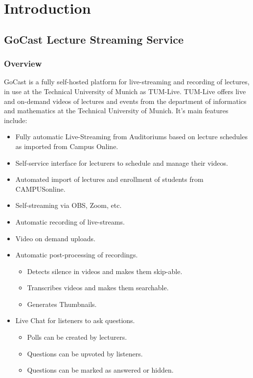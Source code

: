 
\chapter{Introduction}\label{chapter:introduction}

\section{GoCast Lecture Streaming Service}

\subsection{Overview}

GoCast is a fully self-hosted platform for live-streaming and recording of lectures, in use at the Technical University of Munich as TUM-Live.
TUM-Live offers live and on-demand videos of lectures and events from the department of informatics and mathematics at the Technical University of Munich. 
It's main features include:

\begin{itemize}
    \item Fully automatic Live-Streaming from Auditoriums based on lecture schedules as imported from Campus Online.
    \item Self-service interface for lecturers to schedule and manage their videos.
    \item Automated import of lectures and enrollment of students from CAMPUSonline.
    \item Self-streaming via OBS, Zoom, etc.
    \item Automatic recording of live-streams.
    \item Video on demand uploads.
    \item Automatic post-processing of recordings.
    \begin{itemize}
        \item Detects silence in videos and makes them skip-able.
        \item Transcribes videos and makes them searchable.
        \item Generates Thumbnails.
    \end{itemize}
    \item Live Chat for listeners to ask questions.
    \begin{itemize}
        \item Polls can be created by lecturers.
        \item Questions can be upvoted by listeners.
        \item Questions can be marked as answered or hidden.
    \end{itemize}
\end{itemize}

